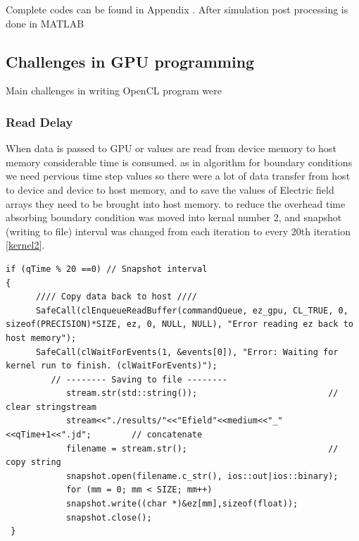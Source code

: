 Complete codes can be found in Appendix %
. After simulation post processing is done in MATLAB
\subsection {Challenges in GPU programming}
Main challenges in writing OpenCL program were

\subsubsection{Read Delay}
When data is passed to GPU or values are read from device memory to host memory considerable time is consumed. as in algorithm for boundary conditions we need pervious time step values so there were a lot of data transfer from host to device and device to host memory, and to save the values of Electric field arrays they need to be brought into host memory. to reduce the overhead time absorbing boundary condition was moved into kernal number 2, and snapshot (writing to file) interval was changed from each iteration to every 20th iteration \ref{kernel2}.
\lstset{language=C,caption=OpenCL saving Efield values in files, label=kernel2}
\begin{lstlisting}
if (qTime % 20 ==0) // Snapshot interval
{
      //// Copy data back to host ////
      SafeCall(clEnqueueReadBuffer(commandQueue, ez_gpu, CL_TRUE, 0,  sizeof(PRECISION)*SIZE, ez, 0, NULL, NULL), "Error reading ez back to host memory");    
      SafeCall(clWaitForEvents(1, &events[0]), "Error: Waiting for kernel run to finish. (clWaitForEvents)");
         // -------- Saving to file -------- 
			stream.str(std::string());   						// clear stringstream
			stream<<"./results/"<<"Efield"<<medium<<"_"<<qTime+1<<".jd";   		// concatenate
			filename = stream.str();		 					// copy string
			snapshot.open(filename.c_str(), ios::out|ios::binary);
			for (mm = 0; mm < SIZE; mm++)
			snapshot.write((char *)&ez[mm],sizeof(float));
			snapshot.close();
 } 
\end{lstlisting}

